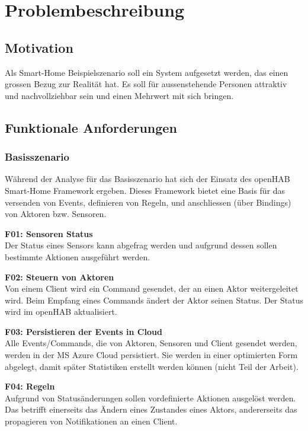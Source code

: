 \section{Problembeschreibung}

\subsection{Motivation}
Als Smart-Home Beispielszenario soll ein System aufgesetzt werden, das einen grossen Bezug zur Realität hat. Es soll für aussenstehende Personen attraktiv und nachvollziehbar sein und einen Mehrwert mit sich bringen.

\subsection{Funktionale Anforderungen}
\subsubsection{Basisszenario}
Während der Analyse für das Basisszenario hat sich der Einsatz des openHAB Smart-Home Framework ergeben. Dieses Framework bietet eine Basis für das versenden von Events, definieren von Regeln, und anschliessen (über Bindings) von Aktoren bzw. Sensoren.

\textbf{F01: Sensoren Status} \\
Der Status eines Sensors kann abgefrag werden und aufgrund dessen sollen bestimmte Aktionen ausgeführt werden.

\textbf{F02: Steuern von Aktoren} \\
Von einem Client wird ein Command gesendet, der an einen Aktor weitergeleitet wird. Beim Empfang eines Commands ändert der Aktor seinen Status. Der Status wird im openHAB aktualisiert.

\textbf{F03: Persistieren der Events in Cloud} \\
Alle Events/Commands, die von Aktoren, Sensoren und Client gesendet werden, werden in der MS Azure Cloud persistiert. Sie werden in einer optimierten Form abgelegt, damit später Statistiken erstellt werden können (nicht Teil der Arbeit).

\textbf{F04: Regeln} \\
Aufgrund von Statusänderungen sollen vordefinierte Aktionen ausgelöst werden. Das betrifft einerseits das Ändern eines Zustandes eines Aktors, andererseits das propagieren von Notifikationen an einen Client.

